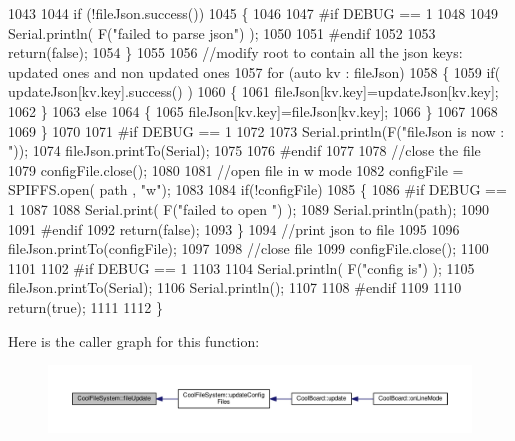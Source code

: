 \begin{DoxyCode}
1043 
1044     \textcolor{keywordflow}{if} (!fileJson.success())
1045     \{
1046 
1047 \textcolor{preprocessor}{    #if DEBUG == 1}
1048 
1049         Serial.println( F(\textcolor{stringliteral}{"failed to parse json"}) );
1050 
1051 \textcolor{preprocessor}{    #endif}
1052 
1053         \textcolor{keywordflow}{return}(\textcolor{keyword}{false});
1054     \}
1055     
1056     \textcolor{comment}{//modify root to contain all the json keys: updated ones and non updated ones}
1057     \textcolor{keywordflow}{for} (\textcolor{keyword}{auto} kv : fileJson) 
1058     \{
1059         \textcolor{keywordflow}{if}( updateJson[kv.key].success() )
1060         \{
1061             fileJson[kv.key]=updateJson[kv.key];            
1062         \}
1063         \textcolor{keywordflow}{else}
1064         \{
1065             fileJson[kv.key]=fileJson[kv.key];
1066         \}
1067 
1068                 
1069     \}
1070 
1071 \textcolor{preprocessor}{#if DEBUG == 1}
1072 
1073     Serial.println(F(\textcolor{stringliteral}{"fileJson is now : "}));
1074     fileJson.printTo(Serial);
1075 
1076 \textcolor{preprocessor}{#endif}
1077 
1078     \textcolor{comment}{//close the file}
1079     configFile.close();
1080 
1081     \textcolor{comment}{//open file in w mode}
1082     configFile = SPIFFS.open( path , \textcolor{stringliteral}{"w"});
1083     
1084     \textcolor{keywordflow}{if}(!configFile)
1085     \{   
1086 \textcolor{preprocessor}{    #if DEBUG == 1}
1087         
1088         Serial.print( F(\textcolor{stringliteral}{"failed to open "}) );
1089         Serial.println(path);
1090 
1091 \textcolor{preprocessor}{    #endif}
1092         \textcolor{keywordflow}{return}(\textcolor{keyword}{false});
1093     \}
1094     \textcolor{comment}{//print json to file    }
1095     
1096     fileJson.printTo(configFile);
1097     
1098     \textcolor{comment}{//close file}
1099     configFile.close();
1100 
1101 
1102 \textcolor{preprocessor}{#if DEBUG == 1}
1103 
1104     Serial.println( F(\textcolor{stringliteral}{"config is"}) );
1105     fileJson.printTo(Serial);
1106     Serial.println();
1107 
1108 \textcolor{preprocessor}{#endif}
1109     
1110     \textcolor{keywordflow}{return}(\textcolor{keyword}{true});
1111     
1112 \}
\end{DoxyCode}
Here is the caller graph for this function\+:\nopagebreak
\begin{figure}[H]
\begin{center}
\leavevmode
\includegraphics[width=350pt]{classCoolFileSystem_a13f2958f5b87757c31fc53797a30d23a_icgraph}
\end{center}
\end{figure}
\mbox{\label{classCoolFileSystem_a3223ffff4266a6300988fab956d6b4b2}} 
